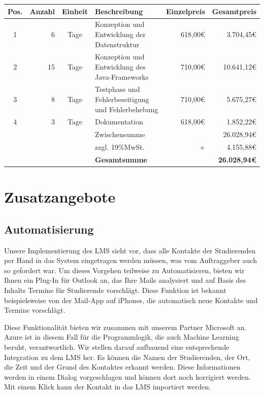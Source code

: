 \documentclass[10pt,a4paper]{article}
\begin{document}
\hspace{-75pt}
\begin{tabular}{|c|r|c|l|r|r|}
	\hline
	Pos. & Anzahl & Einheit & Beschreibung & Einzelpreis & Gesamtpreis \\
	\hline	
	1 & 6 & Tage & Konzeption und Entwicklung der Datenstruktur & 618,00\euro{} & 3.704,45\euro{} \\
	2 & 15 & Tage & Konzeption und Entwicklung des Java-Frameworks & 710,00\euro{} & 10.641,12\euro{} \\
	3 & 8 & Tage & Testphase und Fehlerbeseitigung und Fehlerbehebung & 710,00\euro{} & 5.675,27\euro{} \\
	4 & 3 & Tage & Dokumentation & 618,00\euro{} & 1.852,22\euro{} \\
	\hline

	& & & Zwischensumme & &  26.028,94\euro{} \\
	& & & zzgl. 19\%MwSt. & + &  4.155,88\euro{} \\
	\hline
	& & & \textbf{Gesamtsumme} & & \textbf{26.028,94\euro{}} \\
	\hline
\end{tabular}

\section{Zusatzangebote}
\subsection{Automatisierung}
Unsere Implementierung des LMS sieht vor, dass alle Kontakte der Studierenden per Hand in das System eingetragen werden müssen, was vom Auftraggeber auch so gefordert war. Um dieses Vorgehen teilweise zu Automatisieren, bieten wir Ihnen ein Plug-In für Outlook an, das Ihre Mails analysiert und auf Basis des Inhalts Termine für Studierende vorschlägt. Diese Funktion ist bekannt beispielsweise von der Mail-App auf iPhones, die automatisch neue Kontakte und Termine vorschlägt.

Diese Funktionalität bieten wir zusammen mit unserem Partner Microsoft an. Azure ist in diesem Fall für die Programmlogik, die auch Machine Learning beruht, verantwortlich. Wir stellen darauf aufbauend eine entsprechende Integration zu dem LMS her. Es können die Namen der Studierenden, der Ort, die Zeit und der Grund des Kontaktes erkannt werden. Diese Informationen werden in einem Dialog vorgeschlagen und können dort noch korrigiert werden. Mit einem Klick kann der Kontakt in das LMS importiert werden.
\end{document}
